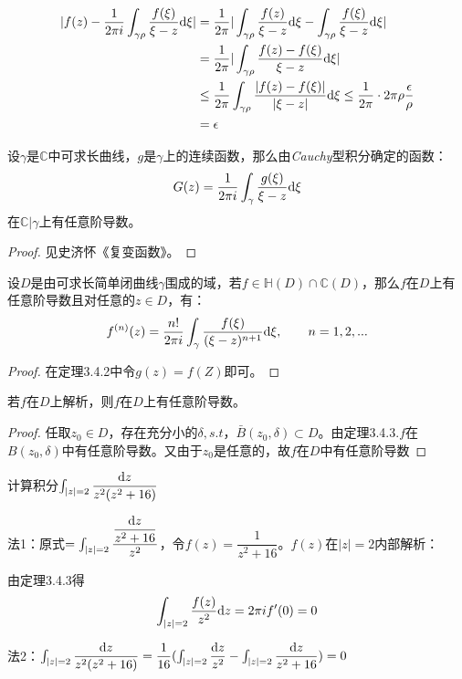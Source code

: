 \begin{align*}
|f(z)-\dfrac{1}{2\pi i}\int_{\gamma\rho}\dfrac{f(\xi)}{\xi-z}\mathrm{d}\xi|&=\dfrac{1}{2\pi}|\int_{\gamma\rho}\dfrac{f(z)}{\xi-z}\mathrm{d}\xi-\int_{\gamma\rho}\dfrac{f(\xi)}{\xi-z}\mathrm{d}\xi|\\
&=\dfrac{1}{2\pi}|\int_{\gamma\rho}\dfrac{f(z)-f(\xi)}{\xi-z}\mathrm{d}\xi|\\
&\leq\dfrac{1}{2\pi}\int_{\gamma\rho}\dfrac{|f(z)-f(\xi)|}{|\xi-z|}\mathrm{d}\xi\leq\dfrac{1}{2\pi}\cdot 2\pi \rho\dfrac{\epsilon}{\rho}\\
&=\epsilon 
\end{align*}
\begin{theorem}
	设$\gamma$是$\mathbb{C}$中可求长曲线，$g$是$\gamma$上的连续函数，那么由\emph{Cauchy}型积分确定的函数：
	\[G(z)=\dfrac{1}{2\pi i}\int_\gamma\dfrac{g(\xi)}{\xi-z}\mathrm{d}\xi\]
	在$\mathbb{C}|\gamma$上有任意阶导数。
\end{theorem}
\begin{proof}
	{见史济怀《复变函数》。}
\end{proof}{}
\begin{theorem}
	设$D$是由可求长简单闭曲线$\gamma$围成的域，若$f\in\mathbb{H}(D)\cap\mathbb{C}(D)$，那么$f$在$D$上有任意阶导数且对任意的$z\in D$，有：
	\[f^{(n)}(z)=\dfrac{n!}{2\pi i}\int_\gamma\dfrac{f(\xi)}{(\xi-z)^{n+1}}\mathrm{d}\xi, \hspace{2em}n=1,2,...\]
\end{theorem}
\begin{proof}
	在定理3.4.2中令$g(z)=f(Z)$即可。
\end{proof}
\begin{theorem}
	若$f$在$D$上解析，则$f$在$D$上有任意阶导数。
\end{theorem}
\begin{proof}
	任取$z_0\in D$，存在充分小的$\delta,s.t$，$\bar{B}(z_0,\delta)\subset D$。由定理3.4.3.$f$在$B(z_0,\delta)$中有任意阶导数。又由于$z_0$是任意的，故$f$在$D$中有任意阶导数
\end{proof}
\begin{eg}
	计算积分$\int_{|z|=2}\dfrac{\mathrm{d}z}{z^2(z^2+16)}$
	
	法1：原式$=\int_{|z|=2}\dfrac{\dfrac{\mathrm{d}z}{z^2+16}}{z^2}$，令$f(z)=\dfrac{1}{z^2+16}$。$f(z)$在$|z|=2$内部解析：
	
	由定理3.4.3得
	\[\int_{|z|=2}\dfrac{f(z)}{z^2}\mathrm{d}z=2\pi if'(0)=0\]
	
	法2：$\int_{|z|=2}\dfrac{\mathrm{d}z}{z^2(z^2+16)}=\dfrac{1}{16}(\int_{|z|=2}\dfrac{\mathrm{d}z}{z^2}-\int_{|z|=2}\dfrac{\mathrm{d}z}{z^2+16})=0$
\end{eg}

